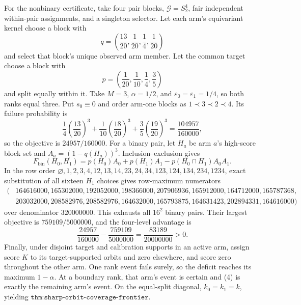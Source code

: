 For the nonbinary certificate, take four pair blocks, \(\mathcal G=S_2^4\), fair independent within-pair assignments, and a singleton selector. Let each arm's equivariant kernel choose a block with
\[
q=\left(\frac{13}{20},\frac1{20},\frac14,\frac1{20}\right)
\]
and select that block's unique observed arm member. Let the common target choose a block with
\[
p=\left(\frac1{20},\frac1{10},\frac14,\frac35\right)
\]
and split equally within it. Take \(M=3\), \(\alpha=1/2\), and \(\varepsilon_0=\varepsilon_1=1/4\), so both ranks equal three. Put \(s_0\equiv0\) and order arm-one blocks as \(1\prec3\prec2\prec4\). Its failure probability is
\[
\frac14\left(\frac{13}{20}\right)^3+\frac1{10}\left(\frac{18}{20}\right)^3+\frac35\left(\frac{19}{20}\right)^3=\frac{104957}{160000},
\tag{6}
\]
so the objective is \(24957/160000\). For a binary pair, let \(H_a\) be arm \(a\)'s high-score block set and \(A_a=(1-q(H_a))^3\). Inclusion--exclusion gives
\[
F_{\mathrm{bin}}(H_0,H_1)=p(H_0)A_0+p(H_1)A_1-p(H_0\cap H_1)A_0A_1.
\tag{7}
\]
In the row order \(\varnothing,1,2,3,4,12,13,14,23,24,34,123,124,134,234,1234\), exact substitution of all sixteen \(H_1\) choices gives row-maximum numerators
\[
\begin{split}
(&164616000,165302000,192052000,198366000,207906936,165912000,164712000,165787368,\\
&203032000,208582976,208582976,164632000,165793875,164631423,202894331,164616000)
\end{split}
\tag{8}
\]
over denominator \(320000000\). This exhausts all \(16^2\) binary pairs. Their largest objective is \(759109/5000000\), and the four-level advantage is
\[
\frac{24957}{160000}-\frac{759109}{5000000}=\frac{83189}{20000000}>0.
\tag{9}
\]
Finally, under disjoint target and calibration supports in an active arm, assign score \(K\) to its target-supported orbits and zero elsewhere, and score zero throughout the other arm. One rank event fails surely, so the deficit reaches its maximum \(1-\alpha\). At a boundary rank, that arm's event is certain and (4) is exactly the remaining arm's event. On the equal-split diagonal, \(k_0=k_1=k\), yielding \(\texttt{thm:sharp-orbit-coverage-frontier}\).